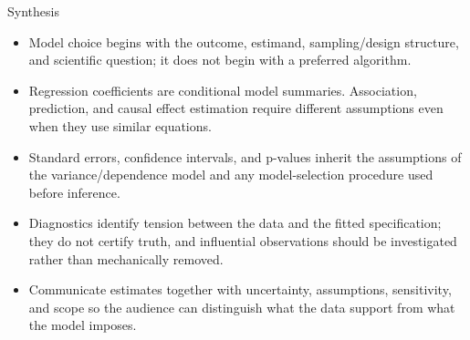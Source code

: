 \documentclass[aspectratio=169]{beamer}
\begin{document}
\begin{frame}{Synthesis}
  \begin{itemize}
    \item Model choice begins with the outcome, estimand, sampling/design structure, and scientific question; it does not begin with a preferred algorithm.
    \item Regression coefficients are conditional model summaries. Association, prediction, and causal effect estimation require different assumptions even when they use similar equations.
    \item Standard errors, confidence intervals, and p-values inherit the assumptions of the variance/dependence model and any model-selection procedure used before inference.
    \item Diagnostics identify tension between the data and the fitted specification; they do not certify truth, and influential observations should be investigated rather than mechanically removed.
    \item Communicate estimates together with uncertainty, assumptions, sensitivity, and scope so the audience can distinguish what the data support from what the model imposes.
  \end{itemize}
\end{frame}

\contactslide
\end{document}
